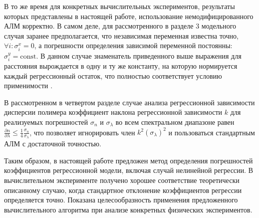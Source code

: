 \documentclass[11pt,a4paper]{article}
\theoremstyle{definition}
\begin{document}
\begin{enumerate}
	В то же время для конкретных вычислительных экспериментов, результаты которых
	представлены в настоящей работе, использование немодифицированного АЛМ корректно.
	В самом деле, для рассмотренного в разделе 3 модельного случая заранее
	предполагается, что независимая переменная известна точно,
	$\forall i : \sigma^x_i = 0$, а погрешности определения зависимой переменной
	постоянны: $\sigma^y_i = \text{const}$. В данном случае знаменатель приведенного выше выражения
	для расстояния вырождается в одну и ту же константу, на которую нормируется каждый
	регрессионный остаток, что полностью соответствует условию применимости .

	В рассмотренном в четвертом разделе случае анализа регрессионной
	зависимости дисперсии полимера коэффициент наклона регрессионной
	зависимости $k$ для реализуемых погрешностей $\sigma_n$ и $\sigma_{\lambda}$
	во всем спектральном диапазоне равен
	$\frac{\partial n}{\partial \lambda} \leq \frac{1}{4} \frac{\sigma_n}{\sigma_{\lambda}}$,
	что позволяет игнорировать член $k^2 (\sigma_{\lambda})^2$ и пользоваться
	стандартным АЛМ с достаточной точностью.
\end{enumerate}

Таким образом, в настоящей работе предложен метод определения
погрешностей коэффициентов регрессионной модели, включая случай нелинейной регрессии. В
вычислительном эксперименте получено хорошее соответствие теоретически описанному случаю, когда
стандартное отклонение коэффициентов регрессии определяется точно.
Показана целесообразность применения предложенного вычислительного
алгоритма при анализе конкретных физических экспериментов.

\FloatBarrier


%
%

\end{document}

